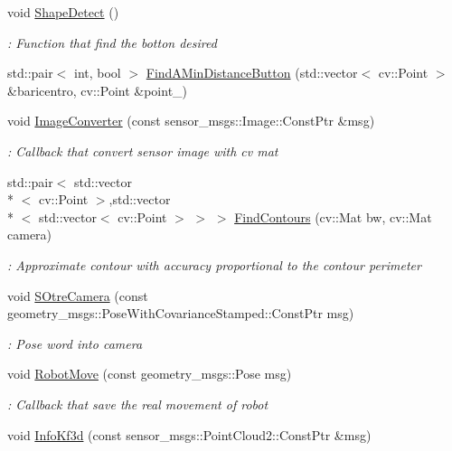 \begin{DoxyCompactItemize}
\item 
void \hyperlink{classCamera_aed48b91bf98f8a6fea81b2ef102bad57}{Shape\-Detect} ()
\begin{DoxyCompactList}\small\item\em \-: Function that find the botton desired \end{DoxyCompactList}\item 
std\-::pair$<$ int, bool $>$ \hyperlink{classCamera_a88882aaa8db8a61e4bcf70fb65cefb9c}{Find\-A\-Min\-Distance\-Button} (std\-::vector$<$ cv\-::\-Point $>$ \&baricentro, cv\-::\-Point \&point\-\_\-)
\item 
void \hyperlink{classCamera_a3f5bb2733fcbed0155a3897699ef6f83}{Image\-Converter} (const sensor\-\_\-msgs\-::\-Image\-::\-Const\-Ptr \&msg)
\begin{DoxyCompactList}\small\item\em \-: Callback that convert sensor image with cv mat \end{DoxyCompactList}\item 
std\-::pair$<$ std\-::vector\\*
$<$ cv\-::\-Point $>$,std\-::vector\\*
$<$ std\-::vector$<$ cv\-::\-Point $>$ $>$ $>$ \hyperlink{classCamera_a85929d090858f78e928e79dd7ba84191}{Find\-Contours} (cv\-::\-Mat bw, cv\-::\-Mat camera)
\begin{DoxyCompactList}\small\item\em \-: Approximate contour with accuracy proportional to the contour perimeter \end{DoxyCompactList}\item 
void \hyperlink{classCamera_ae11c79efd19a4ef9f101723822c0db1b}{S\-Otre\-Camera} (const geometry\-\_\-msgs\-::\-Pose\-With\-Covariance\-Stamped\-::\-Const\-Ptr msg)
\begin{DoxyCompactList}\small\item\em \-: Pose word into camera \end{DoxyCompactList}\item 
void \hyperlink{classCamera_ace564958da0785b8cce36753ba18e6e5}{Robot\-Move} (const geometry\-\_\-msgs\-::\-Pose msg)
\begin{DoxyCompactList}\small\item\em \-: Callback that save the real movement of robot \end{DoxyCompactList}\item 
void \hyperlink{classCamera_a5230d27120df98fdc14532e2ac6aacb0}{Info\-Kf3d} (const sensor\-\_\-msgs\-::\-Point\-Cloud2\-::\-Const\-Ptr \&msg)

\end{DoxyCompactItemize}
